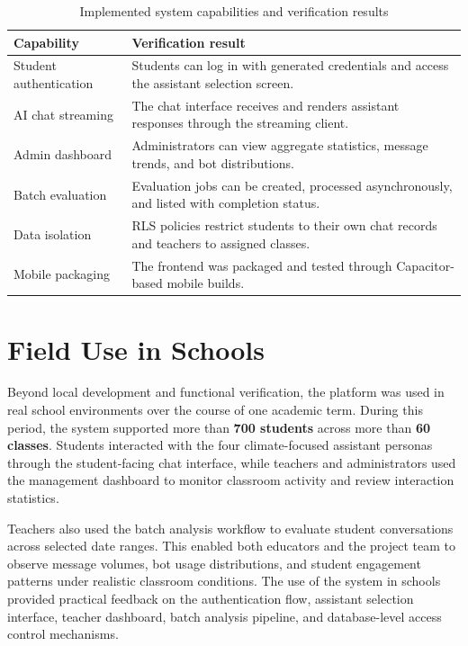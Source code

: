 \documentclass[12pt,a4paper,oneside]{report}
\begin{document}
    \begin{table}[H]
        \centering
        \caption{Implemented system capabilities and verification results}
        \label{tab:verification_results}
        \begin{tabular}{@{}p{4.5cm}p{8cm}@{}}
            \toprule
            \textbf{Capability} & \textbf{Verification result} \\
            \midrule
            Student authentication & Students can log in with generated credentials and access the assistant selection screen. \\
            AI chat streaming & The chat interface receives and renders assistant responses through the streaming client. \\
            Admin dashboard & Administrators can view aggregate statistics, message trends, and bot distributions. \\
            Batch evaluation & Evaluation jobs can be created, processed asynchronously, and listed with completion status. \\
            Data isolation & RLS policies restrict students to their own chat records and teachers to assigned classes. \\
            Mobile packaging & The frontend was packaged and tested through Capacitor-based mobile builds. \\
            \bottomrule
        \end{tabular}
    \end{table}

    \section{Field Use in Schools}
    \label{sec:field_use}

    Beyond local development and functional verification, the platform was used in real school environments over the course of one academic term. During this period, the system supported more than \textbf{700 students} across more than \textbf{60 classes}. Students interacted with the four climate-focused assistant personas through the student-facing chat interface, while teachers and administrators used the management dashboard to monitor classroom activity and review interaction statistics.

    Teachers also used the batch analysis workflow to evaluate student conversations across selected date ranges. This enabled both educators and the project team to observe message volumes, bot usage distributions, and student engagement patterns under realistic classroom conditions. The use of the system in schools provided practical feedback on the authentication flow, assistant selection interface, teacher dashboard, batch analysis pipeline, and database-level access control mechanisms.
\end{document}
